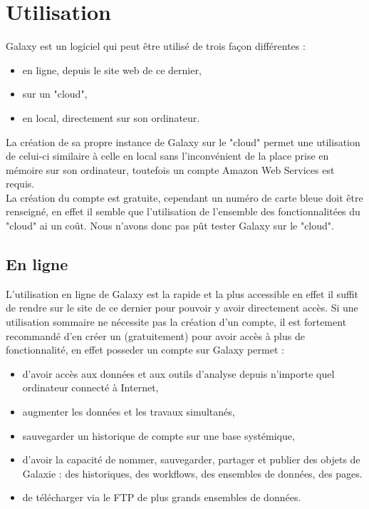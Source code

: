 \chapter{Utilisation}

Galaxy est un logiciel qui peut être utilisé de trois façon différentes : 

\begin{itemize}
\item en ligne, depuis le site web de ce dernier,
\item sur un "cloud",
\item en local, directement sur son ordinateur.\\
\end{itemize}

La création de sa propre instance de Galaxy sur le "cloud" permet une utilisation de celui-ci similaire à celle en local sans l'inconvénient de la place prise en mémoire sur son ordinateur, toutefois un compte Amazon Web Services est requis.\\

La création du compte est gratuite, cependant un numéro de carte bleue doit être renseigné, en effet il semble que l'utilisation de l'ensemble des fonctionnalitées du "cloud" ai un coût. Nous n'avons donc pas pût tester Galaxy sur le "cloud".\\

\section{En ligne}

L'utilisation en ligne de Galaxy est la rapide et la plus accessible en effet il suffit de rendre sur le site de ce dernier pour pouvoir y avoir directement accès. Si une utilisation sommaire ne nécessite pas la création d'un compte, il est fortement recommandé d'en créer un (gratuitement) pour avoir accès à plus de fonctionnalité, en effet posseder un compte sur Galaxy permet :\\

\begin{itemize}
\item d'avoir accès aux données et aux outils d'analyse depuis n'importe quel ordinateur connecté à Internet,
\item augmenter les données et les travaux simultanés,
\item sauvegarder un historique de compte sur une base systémique,
\item d'avoir la capacité de nommer, sauvegarder, partager et publier des objets de Galaxie : des historiques, des workflows, des ensembles de données, des pages.
\item de télécharger via le FTP de plus grands ensembles de données.\\
\end{itemize}

